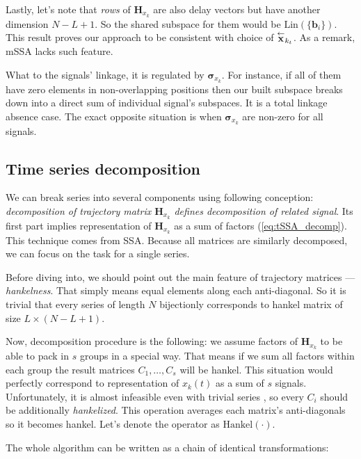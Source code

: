 	Lastly, let's note that \emph{rows} of $ \mathbf{H}_{x_k} $ are also delay vectors but have another dimension $ N - L + 1 $. So the shared subspace for them would be $ \text{Lin}(\{\mathbf{b}_i\}) $. This result proves our approach to be consistent with choice of $ \overset{\leftarrow}{\mathbf{x}}_{k_t} $. As a remark, mSSA lacks such feature.
	
	What to the signals' linkage, it is regulated by $ \boldsymbol{\sigma}_{x_k} $. For instance, if all of them have zero elements in non-overlapping positions then our built subspace breaks down into a direct sum of individual signal's subspaces. It is a total linkage absence case. The exact opposite situation is when $ \boldsymbol{\sigma}_{x_k} $ are non-zero for all signals.
	
	\subsection*{Time series decomposition}\label{sec:decomposition}
	
	We can break series into several components using following conception: \emph{decomposition of trajectory matrix $ \mathbf{H}_{x_k} $ defines decomposition of related signal}. Its first part implies representation of $ \mathbf{H}_{x_k} $ as a sum of factors (\ref{eq:tSSA_decomp}). This technique comes from SSA. Because all matrices are similarly decomposed, we can focus on the task for a single series.
	
	Before diving into, we should point out the main feature of trajectory matrices --- \emph{hankelness}. That simply means equal elements along each anti-diagonal. So it is trivial that every series of length $ N $ bijectionly corresponds to hankel matrix of size $ L \times (N - L + 1) $.
	
	Now, decomposition procedure is the following: we assume factors of $ \mathbf{H}_{x_k} $ to be able to pack in $ s $ groups in a special way. That means if we sum all factors within each group the result matrices $ C_1, \ldots, C_s $ will be hankel. This situation would perfectly correspond to representation of $ x_k(t) $ as a sum of $ s $ signals. Unfortunately, it is almost infeasible even with trivial series \cite{ecfb9dc578be43ae9ee8fc88b8ff9151}, so every $ C_i $ should be additionally \emph{hankelized}. This operation averages each matrix's anti-diagonals so it becomes hankel. Let's denote the operator as $ \text{Hankel}(\cdot) $. 
	
	The whole algorithm can be written as a chain of identical transformations:
	
